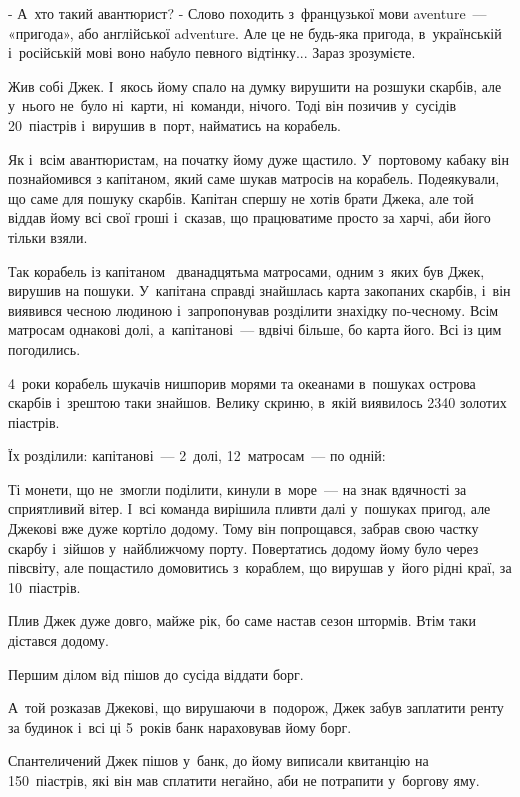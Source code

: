 \problem
{}
- А~хто такий авантюрист?
- Слово походить з~французької мови aventure~--- «пригода»,
або англійської adventure. Але це не будь-яка пригода,
в~українській і~російській мові воно набуло певного відтінку...
Зараз зрозумієте.

Жив собі Джек. І~якось йому спало на думку вирушити на розшуки скарбів,
але у~нього не~було ні~карти, ні~команди, нічого. Тоді він позичив
у~сусідів 20~піастрів і~вирушив в~порт, найматись на корабель.

Як і~всім авантюристам, на початку йому дуже щастило.
У~портовому кабаку він познайомився з капітаном, який саме шукав
матросів на корабель. Подеякували, що саме для пошуку скарбів.
Капітан спершу не хотів брати Джека, але той віддав йому всі свої
гроші і~сказав, що працюватиме просто за харчі, аби його тільки взяли.

Так корабель із капітаном  дванадцятьма матросами, одним з~яких був Джек,
вирушив на пошуки. У~капітана справді знайшлась карта закопаних скарбів,
і~він виявився чесною людиною і~запропонував розділити знахідку по-чесному.
Всім матросам однакові долі, а~капітанові~--- вдвічі більше, бо карта його.
Всі із цим погодились.

4~роки корабель шукачів нишпорив морями та океанами в~пошуках острова
скарбів і~зрештою таки знайшов. Велику скриню, в~якій виявилось
2340 золотих піастрів.

Їх розділили: капітанові~--- 2~долі, 12~матросам~--- по одній:

Ті монети, що не~змогли поділити, кинули в~море~--- на знак вдячності
за сприятливий вітер. І~всі команда вирішила пливти далі у~пошуках пригод,
але Джекові вже дуже кортіло додому. Тому він попрощався, забрав свою
частку скарбу і~зійшов у~найближчому порту. Повертатись додому йому було
через півсвіту, але пощастило домовитись з~кораблем, що вирушав у~його
рідні краї, за 10~піастрів.

Плив Джек дуже довго, майже рік, бо саме настав сезон штормів.
Втім таки дістався додому.

Першим ділом від пішов до сусіда віддати борг.

А~той розказав Джекові, що вирушаючи в~подорож, Джек забув заплатити
ренту за будинок і~всі ці 5~років банк нараховував йому борг.

Спантеличений Джек пішов у~банк, до йому виписали квитанцію на 150~піастрів,
які він мав сплатити негайно, аби не потрапити у~боргову яму.

